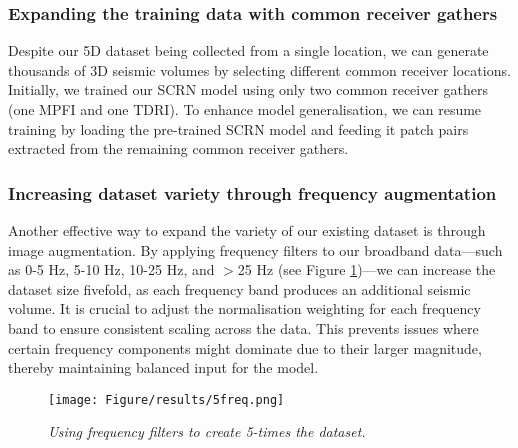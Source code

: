 \subsubsection{Expanding the training data with common receiver gathers}
Despite our 5D dataset being collected from a single location, we can generate thousands of 3D seismic volumes by selecting different common receiver locations. Initially, we trained our SCRN model using only two common receiver gathers (one MPFI and one TDRI). To enhance model generalisation, we can resume training by loading the pre-trained SCRN model and feeding it patch pairs extracted from the remaining common receiver gathers. 

\subsubsection{Increasing dataset variety through frequency augmentation} 
Another effective way to expand the variety of our existing dataset is through image augmentation. By applying frequency filters to our broadband data—such as 0-5 Hz, 5-10 Hz, 10-25 Hz, and $>$25 Hz (see Figure \ref{fig:5freq})—we can increase the dataset size fivefold, as each frequency band produces an additional seismic volume. It is crucial to adjust the normalisation weighting for each frequency band to ensure consistent scaling across the data. This prevents issues where certain frequency components might dominate due to their larger magnitude, thereby maintaining balanced input for the model.
\begin{figure}[ht]
	\centering
	\texttt{[image: Figure/results/5freq.png]} %
	\caption{\textit{Using frequency filters to create 5-times the dataset.}}
	\label{fig:5freq}
\end{figure}

